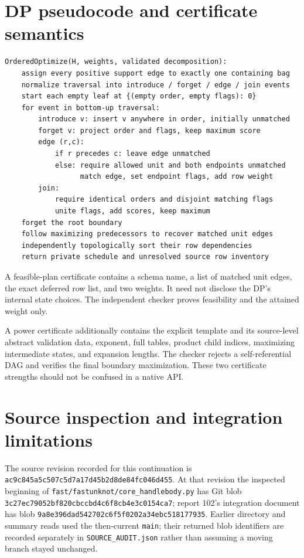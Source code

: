 \documentclass[11pt,a4paper]{article}
\theoremstyle{definition}
\theoremstyle{remark}
\newcommand{\code}[1]{\nolinkurl{#1}}
\begin{document}
\section{DP pseudocode and certificate semantics}
\begin{lstlisting}
OrderedOptimize(H, weights, validated decomposition):
    assign every positive support edge to exactly one containing bag
    normalize traversal into introduce / forget / edge / join events
    start each empty leaf at {(empty order, empty flags): 0}
    for event in bottom-up traversal:
        introduce v: insert v anywhere in order, initially unmatched
        forget v: project order and flags, keep maximum score
        edge (r,c):
            if r precedes c: leave edge unmatched
            else: require allowed unit and both endpoints unmatched
                  match edge, set endpoint flags, add row weight
        join:
            require identical orders and disjoint matching flags
            unite flags, add scores, keep maximum
    forget the root boundary
    follow maximizing predecessors to recover matched unit edges
    independently topologically sort their row dependencies
    return private schedule and unresolved source row inventory
\end{lstlisting}

A feasible-plan certificate contains a schema name, a list of matched unit
edges, the exact deferred row list, and two weights. It need not disclose
the DP's internal state choices. The independent checker proves
feasibility and the attained weight only.

A power certificate additionally contains the explicit template and its
source-level abstract validation data, exponent, full tables, product child
indices, maximizing intermediate states, and expansion lengths. The
checker rejects a self-referential DAG and verifies the final boundary
maximization. These two certificate strengths should not be confused in a
native API.

\section{Source inspection and integration limitations}
\label{app:sources}
The source revision recorded for this continuation is
\code{ac9c845a5c507c5d7a17d45b2d8de84fc046d455}. At that revision the
inspected beginning of \code{fast/fastunknot/core_handlebody.py} has Git
blob \code{3c27ec79052bf820cbccbd4c6f8cb4e3c0154ca7}; report 102's
integration document has blob
\code{9a8e396dad542702c6f5f0202a34ebc518177935}. Earlier directory and
summary reads used the then-current \code{main}; their returned blob
identifiers are recorded separately in \code{SOURCE_AUDIT.json} rather
than assuming a moving branch stayed unchanged.
\end{document}
